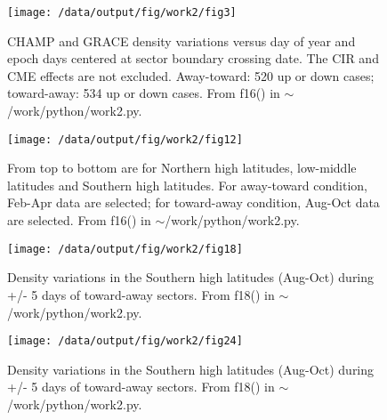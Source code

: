 \documentclass[12pt,a4paper]{article}
\begin{document}
\begin{figure}[!ht]
    \begin{center}
        \texttt{[image: /data/output/fig/work2/fig3]}
        \caption{CHAMP and GRACE density variations versus day of year and epoch days centered at sector boundary crossing date. The CIR and CME effects are not excluded. Away-toward: 520 up or down cases; toward-away: 534 up or down cases. From f16() in $\sim$/work/python/work2.py. }
    \end{center}
    \label{fig6}
\end{figure}

\begin{figure}[!ht]
    \begin{center}
        \texttt{[image: /data/output/fig/work2/fig12]}
        \caption{From top to bottom are for Northern high latitudes, low-middle latitudes and Southern high latitudes. For away-toward condition, Feb-Apr data are selected; for toward-away condition, Aug-Oct data are selected. From f16() in $\sim$/work/python/work2.py.}
    \end{center}
    \label{fig7}
\end{figure}

\begin{figure}[!ht]
    \begin{center}
        \texttt{[image: /data/output/fig/work2/fig18]}
        \caption{Density variations in the Southern high latitudes (Aug-Oct) during +/- 5 days of toward-away sectors. From f18() in $\sim$/work/python/work2.py.}
    \end{center}
    \label{fig8}
\end{figure}

\begin{figure}[!ht]
    \begin{center}
        \texttt{[image: /data/output/fig/work2/fig24]}
        \caption{Density variations in the Southern high latitudes (Aug-Oct) during +/- 5 days of toward-away sectors. From f18() in $\sim$/work/python/work2.py.}
    \end{center}
    \label{fig8}
\end{figure}
\end{document}
